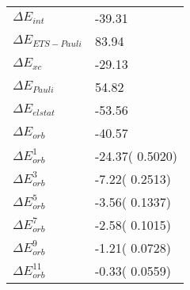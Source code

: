 \begin{table}[]
\caption{}
\label{}
\begin{tabular}{ll}
\hline
$\Delta E_{int}$          &       -39.31   \\
$\Delta E_{ETS-Pauli}$    &        83.94   \\
$\Delta E_{xc}$           &       -29.13   \\
$\Delta E_{Pauli}$        &        54.82   \\
$\Delta E_{elstat}$       &       -53.56   \\
$\Delta E_{orb}$          &       -40.57   \\
$\Delta E^{1}_{orb}$      &       -24.37(      0.5020)   \\
$\Delta E^{3}_{orb}$      &        -7.22(      0.2513)   \\
$\Delta E^{5}_{orb}$      &        -3.56(      0.1337)   \\
$\Delta E^{7}_{orb}$      &        -2.58(      0.1015)   \\
$\Delta E^{9}_{orb}$      &        -1.21(      0.0728)   \\
$\Delta E^{11}_{orb}$     &        -0.33(      0.0559)   \\
\end{tabular}
\end{table}
